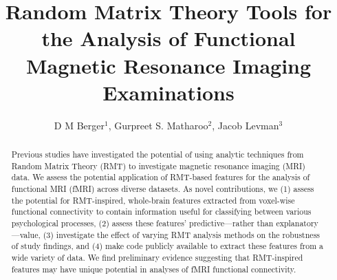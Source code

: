 \documentclass[12pt]{iopart}
\begin{document}
\title[Random Matrix Theory for fMRI]{Random Matrix Theory Tools for the Analysis of Functional Magnetic Resonance Imaging Examinations}
\author{D M Berger$^1$, Gurpreet S. Matharoo$^2$, Jacob Levman$^3$}
\address{$^1$ Computer Science, St. Francis Xavier University, Antigonish, Canada}
\address{$^2$ Physics, St. Francis Xavier University, Antigonish, Canada}
\address{$^3$ Computer Science, St. Francis Xavier University, Antigonish, Canada}



\begin{abstract}
    Previous studies have investigated the potential of using analytic techniques from Random Matrix
    Theory (RMT) to investigate magnetic resonance imaging (MRI) data. We assess the potential
    application of RMT-based features for the analysis of functional MRI (fMRI) across diverse
    datasets. As novel contributions, we (1) assess the potential for RMT-inspired, whole-brain
    features extracted from voxel-wise functional connectivity to contain information useful for
    classifying between various psychological processes, (2) assess these features’
    predictive—rather than explanatory—value, (3) investigate the effect of varying RMT analysis
    methods on the robustness of study findings, and (4) make code publicly available to extract
    these features from a wide variety of data. We find preliminary evidence suggesting that
    RMT-inspired features may have unique potential in analyses of fMRI functional connectivity.
\end{abstract}


\submitto{\PMB}
\maketitle
\end{document}
